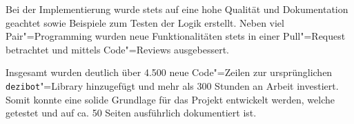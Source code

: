 Bei der Implementierung wurde stets auf eine hohe Qualität und Dokumentation geachtet sowie Beispiele zum Testen der Logik erstellt. Neben viel Pair"=Programming wurden neue Funktionalitäten stets in einer Pull"=Request betrachtet und mittels Code"=Reviews ausgebessert.

Insgesamt wurden deutlich über 4.500 neue Code"=Zeilen zur ursprünglichen \texttt{dezibot}"=Library hinzugefügt und mehr als 300 Stunden an Arbeit investiert. Somit konnte eine solide Grundlage für das Projekt entwickelt werden, welche getestet und auf ca. 50 Seiten ausführlich dokumentiert ist.
